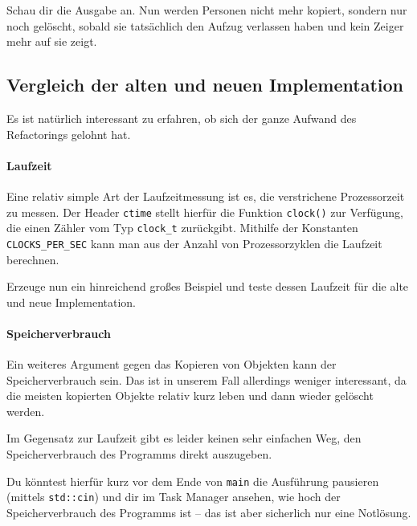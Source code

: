 Schau dir die Ausgabe an.
Nun werden Personen nicht mehr kopiert, sondern nur noch gelöscht, sobald sie tatsächlich den Aufzug verlassen haben und kein Zeiger mehr auf sie zeigt.

\subsection{Vergleich der alten und neuen Implementation}

Es ist natürlich interessant zu erfahren, ob sich der ganze Aufwand des Refactorings gelohnt hat.

\paragraph{Laufzeit}
Eine relativ simple Art der Laufzeitmessung ist es, die verstrichene Prozessorzeit zu messen.
Der Header \lstinline{ctime} stellt hierfür die Funktion \lstinline{clock()} zur Verfügung, die einen Zähler vom Typ \lstinline{clock_t} zurückgibt.
Mithilfe der Konstanten \lstinline{CLOCKS_PER_SEC} kann man aus der Anzahl von Prozessorzyklen die Laufzeit berechnen.

Erzeuge nun ein hinreichend großes Beispiel und teste dessen Laufzeit für die alte und neue Implementation.



\paragraph{Speicherverbrauch}
Ein weiteres Argument gegen das Kopieren von Objekten kann der Speicherverbrauch sein.
Das ist in unserem Fall allerdings weniger interessant, da die meisten kopierten Objekte relativ kurz leben und dann wieder gelöscht werden.

Im Gegensatz zur Laufzeit gibt es leider keinen sehr einfachen Weg, den Speicherverbrauch des Programms direkt auszugeben.

Du könntest hierfür kurz vor dem Ende von \lstinline{main} die Ausführung pausieren (mittels \lstinline{std::cin}) und dir im Task Manager ansehen, wie hoch der Speicherverbrauch des Programms ist -- das ist aber sicherlich nur eine Notlösung.
